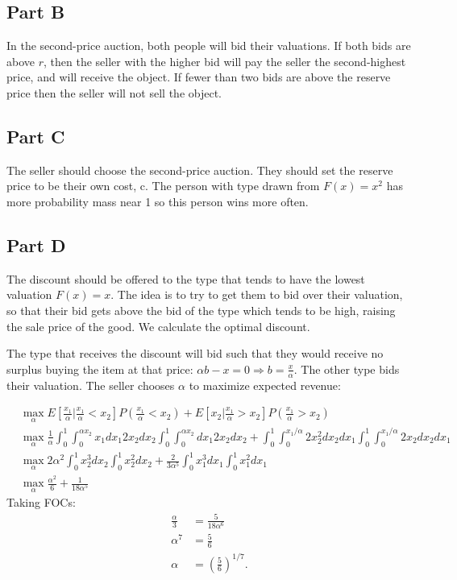 \documentclass[11pt]{article} %
\begin{document}
\subsection{Part B}
In the second-price auction, both people will bid their valuations. If both bids are above $r$, then the seller with the higher bid will pay the seller the second-highest price, and will receive the object. If fewer than two bids are above the reserve price then the seller will not sell the object.
\subsection{Part C}
The seller should choose the second-price auction. They should set the reserve price to be their own cost, c. The person with type drawn from $F(x) = x^2$ has more probability mass near 1 so this person wins more often.
\subsection{Part D}
The discount should be offered to the type that tends to have the lowest valuation $F(x) = x$. The idea is to try to get them to bid over their valuation, so that their bid gets above the bid of the type which tends to be high, raising the sale price of the good. We calculate the optimal discount.

The type that receives the discount will bid such that they would receive no surplus buying the item at that price: $\alpha b - x = 0\Rightarrow b = \frac{x}{\alpha}$. The other type bids their valuation. The seller chooses $\alpha$ to maximize expected revenue:

\begin{align*}
&\max_{\alpha} E\left[\frac{x_1}{\alpha}|\frac{x_1}{\alpha}<x_2\right] P\left(\frac{x_1}{\alpha}<x_2\right) + E\left[x_2|\frac{x_1}{\alpha}>x_2\right] P\left(\frac{x_1}{\alpha}>x_2\right)\\
&\max_{\alpha} \frac{1}{\alpha}\int_{0}^1\int_{0}^{\alpha x_2} x_1 dx_1 2x_2 dx_2 \int_{0}^1\int_{0}^{\alpha x_2} dx_1 2x_2 dx_2 + \int_{0}^1\int_{0}^{x_1/\alpha} 2x_2^2 dx_2 dx_1 \int_{0}^1\int_{0}^{x_1/\alpha}2x_2 dx_2  dx_1 \\
&\max_{\alpha} 2\alpha^2\int_{0}^1 x_2^3  dx_2 \int_{0}^1 x_2^2 dx_2 + \frac{2}{3\alpha^5}\int_{0}^1 x_1^3 dx_1 \int_{0}^1 x_1^2 dx_1 \\
&\max_{\alpha} \frac{\alpha^2}{6}+ \frac{1}{18\alpha^5} 
\end{align*}
Taking FOCs:
\begin{align*}
\frac{\alpha}{3} &= \frac{5}{18\alpha^6}\\
\alpha^7 &= \frac{5}{6}\\
\alpha &= \left( \frac{5}{6} \right)^{1/7}.
\end{align*}
\end{document}
